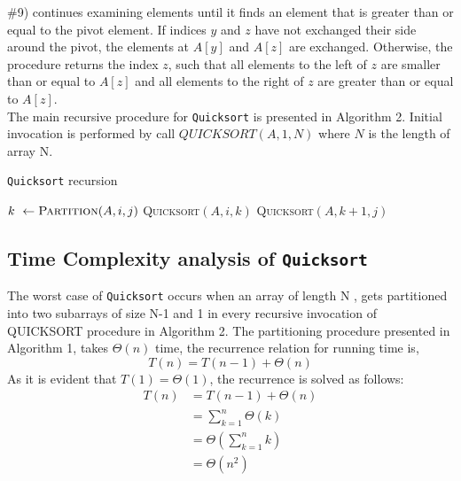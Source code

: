 \documentclass[a4paper, 15pt,twocolumn]{article}
\begin{document}
$\#$9) continues examining elements until it finds an
element that is greater than or equal to the pivot
element. If indices $y$ and $z$ have not exchanged
their side around the pivot, the elements at $A[y]$
and $A[z]$ are exchanged. Otherwise, the procedure
returns the index $z$, such that all elements to the
left of $z$ are smaller than or equal to $A[z]$ and all
elements to the right of $z$ are greater than or equal
to $A[z]$.\\
The main recursive procedure for \texttt{Quicksort} is
presented in Algorithm 2. Initial invocation is performed by call $QUICKSORT(A, 1, N )$ where $N$ is
the length of array N.
\begin{algorithm}
  \caption{\texttt{Quicksort} recursion}
  \label{algo:qui_sort1}
  \begin{algorithmic}[1]
     \newline
             \State $k \ \leftarrow \textsc{Partition}(A,i,j)$
             \State \textsc{Quicksort}$(A,i,k)$
             \State \textsc{Quicksort}$(A,k+1,j)$
         \EndIf
     \EndProcedure 
  \end{algorithmic}
\end{algorithm}

\subsection{Time Complexity analysis of \texttt{Quicksort}}
The worst case of \texttt{Quicksort} occurs when an array of length N , gets partitioned into two subarrays
of size N-1 and 1 in every recursive invocation of
QUICKSORT procedure in Algorithm 2. The partitioning procedure presented in Algorithm 1, takes
$\Theta(n)$ time, the recurrence relation for running time
is,\\
\begin{equation*}
\textit{T}(n)=\textit{T}(n-1)+\Theta(n)
\end{equation*}
As it is evident that $\textit{T}(1)=\Theta(1)$, the recurrence is solved as follows:
\indent
\begin{align*}
\textit{T}(n)&= \textit{T}(n-1)+\Theta(n)\\
&= \sum_{k=1}^{n}\Theta(k)\\
&= \Theta\left(\sum_{k=1}^{n}k\right)	\\
&= \Theta(n^2)\\
\end{align*}
\end{document}
